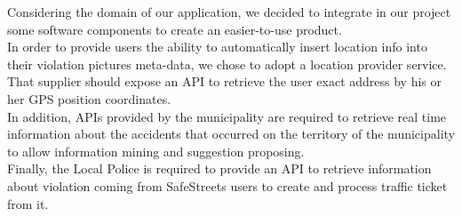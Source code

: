 Considering the domain of our application, we  decided to integrate in our project some software components to create an easier-to-use product. 
\\In order to provide users the ability to automatically insert location info into their violation pictures meta-data, we chose to adopt a location provider service. That supplier should expose an API to retrieve the user exact address by his or her GPS position coordinates. 
\\In addition, APIs provided by the municipality are required to retrieve real time information about the accidents	that	occurred	on	the	territory	of	the	municipality to allow information mining and suggestion proposing.
\\Finally, the Local Police is required to provide an API to retrieve information about violation coming from SafeStreets users to create and process traffic ticket from it.
\clearpage